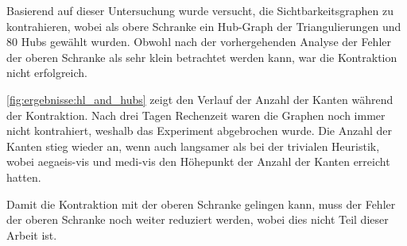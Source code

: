 Basierend auf dieser Untersuchung wurde versucht, die Sichtbarkeitsgraphen zu kontrahieren, wobei als obere Schranke ein Hub-Graph der Triangulierungen und 80 Hubs gewählt wurden.
Obwohl nach der vorhergehenden Analyse der Fehler der oberen Schranke als sehr klein betrachtet werden kann, war die Kontraktion nicht erfolgreich.

\autoref{fig:ergebnisse:hl_and_hubs} zeigt den Verlauf der Anzahl der Kanten während der Kontraktion.
Nach drei Tagen Rechenzeit waren die Graphen noch immer nicht kontrahiert, weshalb das Experiment abgebrochen wurde.
Die Anzahl der Kanten stieg wieder an, wenn auch langsamer als bei der trivialen Heuristik, wobei aegaeis-vis und medi-vis den Höhepunkt der Anzahl der Kanten erreicht hatten.

Damit die Kontraktion mit der oberen Schranke gelingen kann, muss der Fehler der oberen Schranke noch weiter reduziert werden, wobei dies nicht Teil dieser Arbeit ist.

